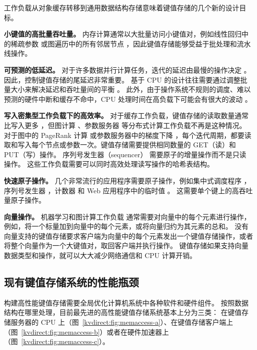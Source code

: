工作负载从对象缓存转移到通用数据结构存储意味着键值存储的几个新的设计目标。

\textbf {小键值的高批量吞吐量。}
内存计算通常以大批量访问小键值对，例如线性回归中的稀疏参数 \cite {li2014algorithmic,xiao17tux2} 或图遍历中的所有邻居节点 \cite {shao2013trinity}，因此键值存储能够受益于批处理和流水线操作。

\textbf {可预测的低延迟。}
对于许多数据并行计算任务，迭代的延迟由最慢的操作决定 \cite {ousterhout2015ramcloud}。 因此，控制键值存储的尾延迟非常重要。
基于 CPU 的设计往往需要通过调整批量大小来解决延迟和吞吐量间的平衡 \cite {li2016full}。%
此外，由于操作系统不规则的调度、难以预测的硬件中断和缓存不命中，CPU 处理时间在高负载下可能会有很大的波动 \cite {li2016clicknp}。

\textbf {写入密集型工作负载下的高效率。}
对于缓存工作负载，键值存储的读取数量通常比写入更多 \cite {atikoglu2012workload}，但图计算 \cite {page1999pagerank}、参数服务器\cite {li2014scaling} 等分布式计算工作负载不再是这种情况。
对于图中的 PageRank 计算 \cite {page1999pagerank} 或参数服务器中的梯度下降 \cite {li2014scaling}，每个迭代周期，都要读取和写入每个节点或参数一次。键值存储需要提供相同数量的 GET（读）和 PUT（写）操作。
序列号发生器（sequencer）\cite {kalia2016design} 需要原子的增量操作而不是只读操作。
这些工作负载需要可以同时高效处理读写操作的哈希表结构。

\textbf {快速原子操作。}
几个非常流行的应用程序需要原子操作，例如集中式调度程序 \cite {perry2014fastpass}，序列号发生器 \cite {kalia2016design,eris}，计数器 \cite {zhu2015packet} 和 Web 应用程序中的临时值 \cite {atikoglu2012workload}。
这需要单个键上的高吞吐量原子操作。

\textbf {向量操作。}
机器学习和图计算工作负载 \cite {li2014scaling,shao2013trinity,xiao17tux2} 通常需要对向量中的每个元素进行操作，例如，将一个标量加到向量中的每个元素，或将向量归约为其元素的总和。
没有向量支持的键值存储要求客户端为向量中的每个元素发出一个键值存储操作，或者将整个向量作为一个大键值对，取回客户端并执行操作。
键值存储如果支持向量数据类型和操作，就可以大大减少网络通信和 CPU 计算开销。

\subsection{现有键值存储系统的性能瓶颈}
\label{kvdirect:sec:state-of-the-art-kvs}

构建高性能键值存储需要全局优化计算机系统中各种软件和硬件组件。
按照数据结构在哪里处理，目前最先进的高性能键值存储系统基本上分为三类：
在键值存储服务器的 CPU 上（图~\ref{kvdirect:fig:memaccess-a}）、在键值存储客户端上（图~\ref{kvdirect:fig:memaccess-b}）或者在硬件加速器上（图~\ref{kvdirect:fig:memaccess-c}）。


